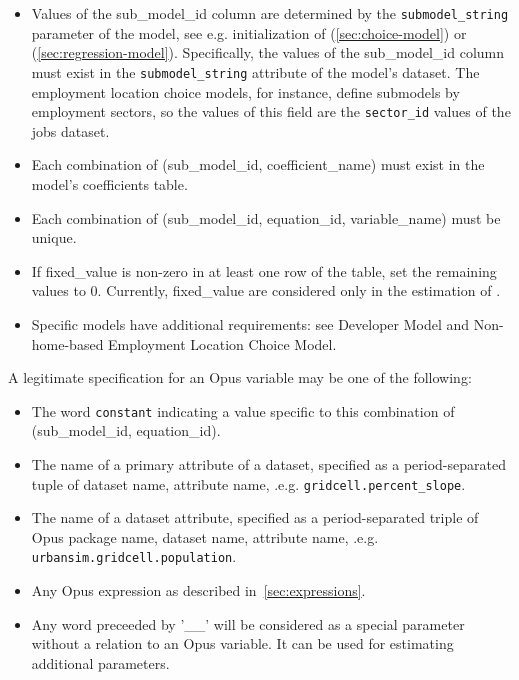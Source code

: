 \begin{itemize} \tight
\item Values of the sub_model_id column are
determined by the \verb|submodel_string| parameter of the model, see e.g. initialization of  
(\ref{sec:choice-model})
or  (\ref{sec:regression-model}). Specifically, the values of the sub_model_id column must 
exist in the \verb|submodel_string| attribute of the model's dataset.
The employment location choice models, for instance, define submodels by
employment sectors, so the values of this field are the
\verb|sector_id| values
of the jobs dataset. 
\item Each combination of (sub_model_id, coefficient_name) \coefficientsindex
must exist in the model's coefficients table.
\item Each combination of (sub_model_id, equation_id, variable_name) \variablesindex must be unique.
\item If fixed_value is non-zero in at least one row of the table, set the remaining values to 0. Currently, fixed_value 
are considered only in the estimation of .
\item Specific models \modelsindex have additional requirements: see Developer Model \modelsindex and Non-home-based Employment Location Choice Model. \modelsindex
\end{itemize}

A legitimate specification for an Opus variable may be one of the following:

\begin{itemize}

\item The word \verb|constant| indicating a value specific to this combination
of (sub_model_id, equation_id).

\item The name of a primary attribute of a dataset, specified as a period-separated
tuple of dataset name, attribute name, .e.g.
\verb|gridcell.percent_slope|.

\item The name of a dataset attribute, specified as a period-separated triple of
Opus package name, dataset name, attribute name, .e.g. \verb|urbansim.gridcell.population|.

\item Any Opus expression as described in~\ref{sec:expressions}.
 
\item Any word preceeded by '__' will be considered as a special parameter without a relation to an Opus variable.
It can be used for estimating additional parameters.
\end{itemize}


